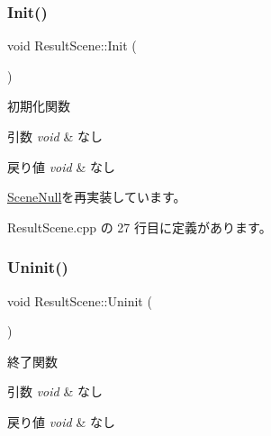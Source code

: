\subsubsection{\texorpdfstring{Init()}{Init()}}
{\footnotesize\ttfamily void Result\+Scene\+::\+Init (\begin{DoxyParamCaption}{ }\end{DoxyParamCaption})\hspace{0.3cm}{\ttfamily [virtual]}}



初期化関数 


\begin{DoxyParams}{引数}
{\em void} & なし \\
\hline
\end{DoxyParams}

\begin{DoxyRetVals}{戻り値}
{\em void} & なし \\
\hline
\end{DoxyRetVals}


\mbox{\hyperlink{class_scene_null_a6b27830a755687f2c00149bcfa739388}{Scene\+Null}}を再実装しています。



 Result\+Scene.\+cpp の 27 行目に定義があります。

\mbox{\label{class_result_scene_a17c396c63a5575a545cd771ece012140}} 
\subsubsection{\texorpdfstring{Uninit()}{Uninit()}}
{\footnotesize\ttfamily void Result\+Scene\+::\+Uninit (\begin{DoxyParamCaption}{ }\end{DoxyParamCaption})\hspace{0.3cm}{\ttfamily [virtual]}}



終了関数 


\begin{DoxyParams}{引数}
{\em void} & なし \\
\hline
\end{DoxyParams}

\begin{DoxyRetVals}{戻り値}
{\em void} & なし \\
\hline
\end{DoxyRetVals}


